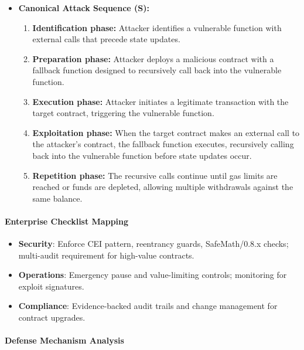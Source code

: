 \begin{itemize}
\item \textbf{Canonical Attack Sequence (S):}
    \begin{enumerate}
    \item \textbf{Identification phase:} Attacker identifies a vulnerable function with external calls that precede state updates.
    \item \textbf{Preparation phase:} Attacker deploys a malicious contract with a fallback function designed to recursively call back into the vulnerable function.
    \item \textbf{Execution phase:} Attacker initiates a legitimate transaction with the target contract, triggering the vulnerable function.
    \item \textbf{Exploitation phase:} When the target contract makes an external call to the attacker's contract, the fallback function executes, recursively calling back into the vulnerable function before state updates occur.
    \item \textbf{Repetition phase:} The recursive calls continue until gas limits are reached or funds are depleted, allowing multiple withdrawals against the same balance.
    \end{enumerate}
\end{itemize}

\paragraph{Enterprise Checklist Mapping}
\begin{itemize}
    \item \textbf{Security}: Enforce CEI pattern, reentrancy guards, SafeMath/0.8.x checks; multi-audit requirement for high-value contracts.
    \item \textbf{Operations}: Emergency pause and value-limiting controls; monitoring for exploit signatures.
    \item \textbf{Compliance}: Evidence-backed audit trails and change management for contract upgrades.
\end{itemize}

\paragraph{Defense Mechanism Analysis}

